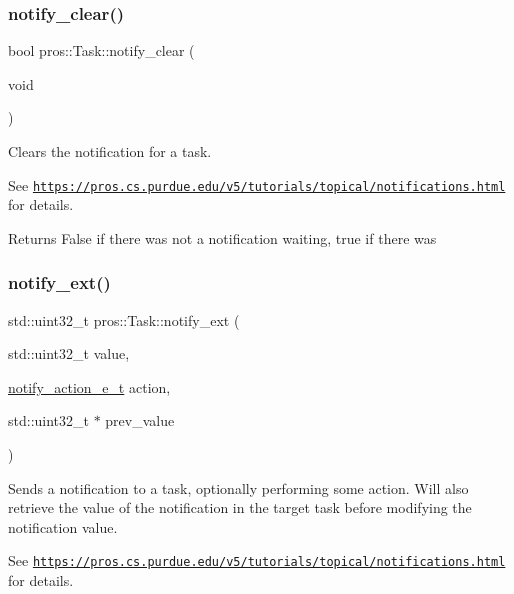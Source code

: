 \subsubsection{\texorpdfstring{notify\+\_\+clear()}{notify\_clear()}}
{\footnotesize\ttfamily bool pros\+::\+Task\+::notify\+\_\+clear (\begin{DoxyParamCaption}\item[{void}]{ }\end{DoxyParamCaption})}

Clears the notification for a task.

See \href{https://pros.cs.purdue.edu/v5/tutorials/topical/notifications.html}{\tt https\+://pros.\+cs.\+purdue.\+edu/v5/tutorials/topical/notifications.\+html} for details.

\begin{DoxyReturn}{Returns}
False if there was not a notification waiting, true if there was 
\end{DoxyReturn}
\mbox{\label{classpros_1_1Task_add5bc6272aaa903fdf8ae6656d8ffddb}} 
\subsubsection{\texorpdfstring{notify\+\_\+ext()}{notify\_ext()}}
{\footnotesize\ttfamily std\+::uint32\+\_\+t pros\+::\+Task\+::notify\+\_\+ext (\begin{DoxyParamCaption}\item[{std\+::uint32\+\_\+t}]{value,  }\item[{\hyperlink{rtos_8h_a42ea99b5e5d38da0b98154609cf6c570}{notify\+\_\+action\+\_\+e\+\_\+t}}]{action,  }\item[{std\+::uint32\+\_\+t $\ast$}]{prev\+\_\+value }\end{DoxyParamCaption})}

Sends a notification to a task, optionally performing some action. Will also retrieve the value of the notification in the target task before modifying the notification value.

See \href{https://pros.cs.purdue.edu/v5/tutorials/topical/notifications.html}{\tt https\+://pros.\+cs.\+purdue.\+edu/v5/tutorials/topical/notifications.\+html} for details.


